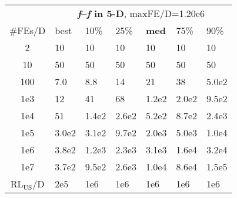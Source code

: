 \begin{tabular}{c|llllll}
 & \multicolumn{6}{|c}{\textbf{\textit{f}\raisebox{-0.35ex}{1}--\textit{f}\raisebox{-0.35ex}{24} in 5-D}, maxFE/D=1.20e6}\\
\#FEs/D & best & 10\% & 25\% & \textbf{med} & 75\% & 90\%\\
2 & 10 & 10 & 10 & 10 & 10 & 10\\
10 & 50 & 50 & 50 & 50 & 50 & 50\\
100 & \hspace*{1ex}7.0 & \hspace*{1ex}8.8 & 14 & 21 & 38 & 5.0e2\\
1e3 & 12 & 41 & 68 & 1.2e2 & 2.0e2 & 9.5e2\\
1e4 & 51 & 1.4e2 & 2.6e2 & 5.2e2 & 8.7e2 & 2.4e3\\
1e5 & 3.0e2 & 3.1e2 & 9.7e2 & 2.0e3 & 5.0e3 & 1.0e4\\
1e6 & 3.8e2 & 1.2e3 & 2.3e3 & 3.1e3 & 1.6e4 & 3.2e4\\
1e7 & 3.7e2 & 9.5e2 & 2.6e3 & 1.0e4 & 8.6e4 & 1.5e5\\
$\text{RL}_{\text{US}}$/D & 2e5 & 1e6 & 1e6 & 1e6 & 1e6 & 1e6
\end{tabular}
